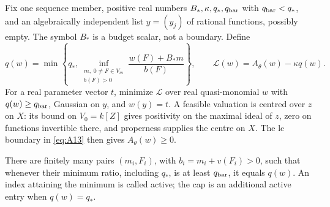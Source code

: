 Fix one sequence member, positive real numbers
\(B_*,\kappa,q_*,q_{\rm bar}\) with \(q_{\rm bar}<q_*\), and an
algebraically independent list \(y=(y_j)\) of rational functions,
possibly empty.  The symbol \(B_*\) is a budget scalar, not a
boundary.  Define
\begin{equation}\label{eq:E3}
 q(w)=\min\left\{q_*,
    \inf_{\substack{m,\;0\ne F\in V_m\\ b(F)>0}}
                  \frac{w(F)+B_*m}{b(F)}\right\},
 \qquad
 \mathcal L(w)=A_\theta(w)-\kappa q(w).
\end{equation}
For a real parameter vector \(t\), minimize \(\mathcal L\) over
real quasi-monomial \(w\) with \(q(w)\ge q_{\rm bar}\), Gaussian
on \(y\), and \(w(y)=t\).  A feasible valuation is centred over
\(z\) on \(X\): its bound on \(V_0=k[Z]\) gives positivity on the
maximal ideal of \(z\), zero on functions invertible there, and
properness supplies the centre on \(X\).  The lc boundary in
\eqref{eq:A13} then gives \(A_\theta(w)\ge0\).

\begin{lemma}\label{c:finite-barrier}
There are finitely many pairs \((m_i,F_i)\), with
\(b_i=m_i+v(F_i)>0\), such that whenever their minimum ratio,
including \(q_*\), is at least \(q_{\rm bar}\), it equals \(q(w)\).
An index attaining the minimum is called active; the cap is an
additional active entry when \(q(w)=q_*\).
\end{lemma}


